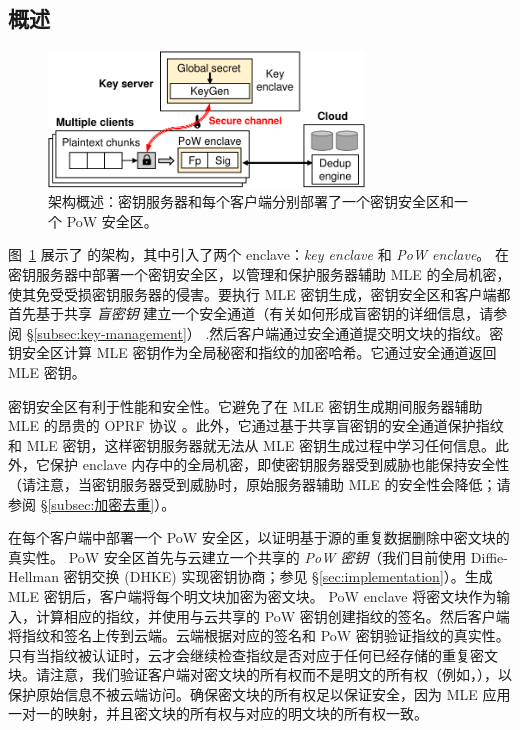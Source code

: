 \subsection{概述}
\label{subsec:arch}

\begin{figure}[t]
\centering
\includegraphics[width=3.3in]{pic/sgxdedup/overview.pdf}
\vspace{-3pt}
\caption{\sysname 架构概述：密钥服务器和每个客户端分别部署了一个密钥安全区和一个 PoW 安全区。}
\label{fig:overview}
\vspace{-3pt}
\end{figure}

 图~\ref{fig:overview} 展示了 \sysname 的架构，其中引入了两个 enclave：{\em key enclave} 和 {\em PoW enclave}。 \sysname 在密钥服务器中部署一个密钥安全区，以管理和保护服务器辅助 MLE 的全局机密，使其免受受损密钥服务器的侵害。要执行 MLE 密钥生成，密钥安全区和客户端都首先基于共享 {\em 盲密钥} 建立一个安全通道（有关如何形成盲密钥的详细信息，请参阅 \S\ref{subsec:key-management}） .然后客户端通过安全通道提交明文块的指纹。密钥安全区计算 MLE 密钥作为全局秘密和指纹的加密哈希。它通过安全通道返回 MLE 密钥。

密钥安全区有利于性能和安全性。它避免了在 MLE 密钥生成期间服务器辅助 MLE 的昂贵的 OPRF 协议 \cite{bellare13b}。此外，它通过基于共享盲密钥的安全通道保护指纹和 MLE 密钥，这样密钥服务器就无法从 MLE 密钥生成过程中学习任何信息。此外，它保护 enclave 内存中的全局机密，即使密钥服务器受到威胁也能保持安全性（请注意，当密钥服务器受到威胁时，原始服务器辅助 MLE 的安全性会降低；请参阅 \S\ref{subsec:加密去重}）。

\sysname 在每个客户端中部署一个 PoW 安全区，以证明基于源的重复数据删除中密文块的真实性。 PoW 安全区首先与云建立一个共享的 {\em PoW 密钥}（我们目前使用 Diffie-Hellman 密钥交换 (DHKE) 实现密钥协商；参见 \S\ref{sec:implementation}）。生成 MLE 密钥后，客户端将每个明文块加密为密文块。 PoW enclave 将密文块作为输入，计算相应的指纹，并使用与云共享的 PoW 密钥创建指纹的签名。然后客户端将指纹和签名上传到云端。云端根据对应的签名和 PoW 密钥验证指纹的真实性。只有当指纹被认证时，云才会继续检查指纹是否对应于任何已经存储的重复密文块。请注意，我们验证客户端对密文块的所有权而不是明文的所有权（例如，\cite{halevi11}），以保护原始信息不被云端访问。确保密文块的所有权足以保证安全，因为 MLE 应用一对一的映射，并且密文块的所有权与对应的明文块的所有权一致。

